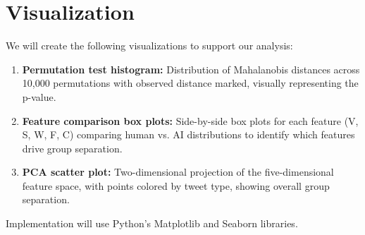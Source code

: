 \section*{Visualization}


We will create the following visualizations to support our analysis:

\begin{enumerate}
    \item \textbf{Permutation test histogram:} Distribution of Mahalanobis distances across 10,000 permutations with observed distance marked, visually representing the p-value.
    
    \item \textbf{Feature comparison box plots:} Side-by-side box plots for each feature (V, S, W, F, C) comparing human vs. AI distributions to identify which features drive group separation.
    
    \item \textbf{PCA scatter plot:} Two-dimensional projection of the five-dimensional feature space, with points colored by tweet type, showing overall group separation.
    

\end{enumerate}

Implementation will use Python's Matplotlib and Seaborn libraries.